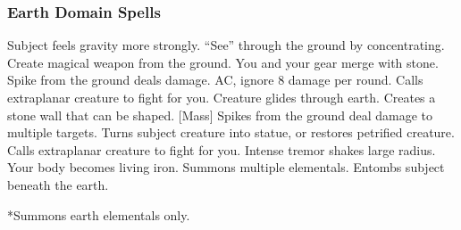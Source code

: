 \begin{comment}
\subsubsection{Dragon Domain Spells}

\begin{spelllist}
    \spellhead[1]{Burning Hands}\fn{1} 1d6 fire damage.
    \spellhead[1]{Command} One subject obeys selected command for 1 round.
    \spellhead[2]{}
    \spellhead[2]{Locate Object} Senses direction toward object (specific or type).
    \spellhead[3]{Lightning Bolt}\fn{1} Large line of electricity deals 3d8 damage.
    \spellhead[4]{Fly} Subject flies at speed of 60 ft.
    \spellhead[4]{Suggestion} Compels subject to follow stated course of action.
    \spellhead[5]{Command}[Mass] As \spell{command}, but affects multiple creatures.
    \spellhead[5]{Cone of Cold}\fn{1} 5d8 cold damage and brief slow in large cone.
    \spellhead[6]{Locate Entity} Locates creatures or objects within 1 mile.
    \spellhead[6]{True Seeing}\M Lets you see all things as they really are.
    \spellhead[7]{Overland Flight} You fly at a speed of 40 ft. and can hustle over long distances.
    \spellhead[7]{Power Word Blind} Blinds bloodied creature.
    \spellhead[8]{Power Word Stun} Stuns bloodied creature.
    \spellhead[8]{Suggestion}[Mass] As \spell{suggestion}, but shorter and affects multiple creatures.
    \spellhead[9]{Power Word Kill} Kills bloodied creature.
    \spellhead[9]{}
\end{spelllist}
1 Used as a breath attack, requiring no somatic components.
\end{comment}

\subsubsection{Earth Domain Spells}

\begin{spelllist}
     Subject feels gravity more strongly.
     ``See'' through the ground by concentrating.
     Create magical weapon from the ground.
    \spellhead[2]{}
     You and your gear merge with stone.
     Spike from the ground deals damage. 
      AC, ignore 8 damage per round.
     Calls extraplanar creature to fight for you.
     Creature glides through earth. 
     Creates a stone wall that can be shaped.
    [Mass] Spikes from the ground deal damage to multiple targets.
     Turns subject creature into statue, or restores petrified creature.
    \spellhead[7]{}
     Calls extraplanar creature to fight for you.
     Intense tremor shakes large radius.
     Your body becomes living iron.
     Summons multiple elementals.
     Entombs subject beneath the earth.
\end{spelllist}
*Summons earth elementals only.

